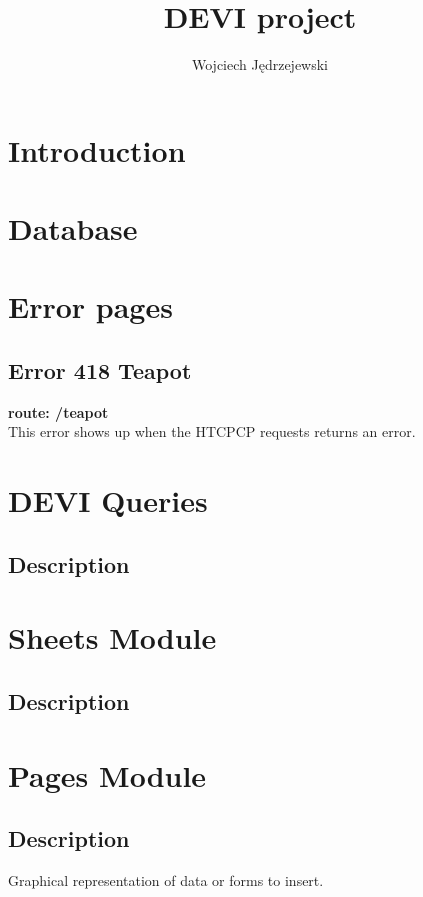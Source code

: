 \documentclass[a4paper, 12pt]{report}
\begin{document}
\title{\Large{\textbf{DEVI project}}}
\author{Wojciech Jędrzejewski}

\maketitle

\tableofcontents

\chapter{Introduction}

\chapter{Database}

\chapter{Error pages}
\section{Error 418 Teapot}
\textbf{route: \color{redText} /teapot} \\
This error shows up when the HTCPCP requests returns an error.

\chapter{DEVI Queries}
\section{Description}

\chapter{Sheets Module}
\section{Description}

\chapter{Pages Module}
\section{Description}
Graphical representation of data or forms to insert.
\end{document}

